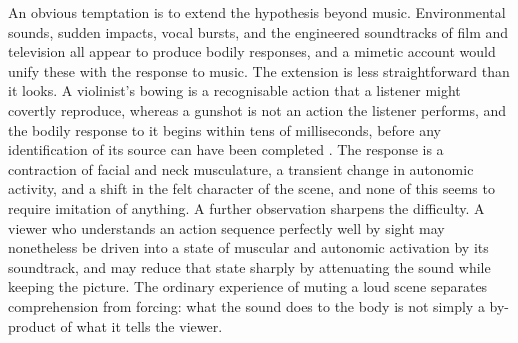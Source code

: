 \documentclass[11pt]{article}
\theoremstyle{plain}
\theoremstyle{definition}
\begin{document}
An obvious temptation is to extend the hypothesis beyond music. Environmental sounds, sudden impacts, vocal bursts, and the engineered soundtracks of film and television all appear to produce bodily responses, and a mimetic account would unify these with the response to music. The extension is less straightforward than it looks. A violinist's bowing is a recognisable action that a listener might covertly reproduce, whereas a gunshot is not an action the listener performs, and the bodily response to it begins within tens of milliseconds, before any identification of its source can have been completed \citep{brown1991,koch1999}. The response is a contraction of facial and neck musculature, a transient change in autonomic activity, and a shift in the felt character of the scene, and none of this seems to require imitation of anything. A further observation sharpens the difficulty. A viewer who understands an action sequence perfectly well by sight may nonetheless be driven into a state of muscular and autonomic activation by its soundtrack, and may reduce that state sharply by attenuating the sound while keeping the picture. The ordinary experience of muting a loud scene separates comprehension from forcing: what the sound does to the body is not simply a by-product of what it tells the viewer.
\end{document}
